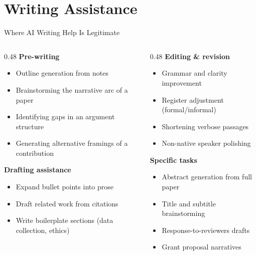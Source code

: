
\section{Writing Assistance}

\begin{frame}{Where AI Writing Help Is Legitimate}
  \begin{columns}[T, onlytextwidth]
    \begin{column}{0.48\textwidth}
      \textbf{Pre-writing}\\
      \begin{itemize}
        \item Outline generation from notes
        \item Brainstorming the narrative arc of a paper
        \item Identifying gaps in an argument structure
        \item Generating alternative framings of a contribution
      \end{itemize}
      \vspace{0.5em}
      \textbf{Drafting assistance}\\
      \begin{itemize}
        \item Expand bullet points into prose
        \item Draft related work from citations
        \item Write boilerplate sections (data collection, ethics)
      \end{itemize}
    \end{column}
    \hfill
    \begin{column}{0.48\textwidth}
      \textbf{Editing \& revision}\\
      \begin{itemize}
        \item Grammar and clarity improvement
        \item Register adjustment (formal/informal)
        \item Shortening verbose passages
        \item Non-native speaker polishing
      \end{itemize}
      \vspace{0.5em}
      \textbf{Specific tasks}\\
      \begin{itemize}
        \item Abstract generation from full paper
        \item Title and subtitle brainstorming
        \item Response-to-reviewers drafts
        \item Grant proposal narratives
      \end{itemize}
    \end{column}
  \end{columns}
\end{frame}

